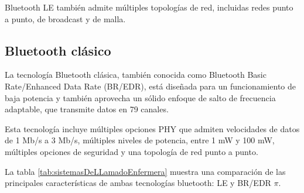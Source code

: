 Bluetooth LE también admite múltiples topologías de red, incluidas redes punto a punto, de broadcast y de malla.


\subsection{Bluetooth clásico}

La tecnología Bluetooth clásica, también conocida como Bluetooth Basic Rate/Enhanced Data Rate (BR/EDR), está diseñada para un funcionamiento de baja potencia y también aprovecha un sólido enfoque de salto de frecuencia adaptable, que transmite datos en 79 canales.

Esta tecnología incluye múltiples opciones PHY que admiten velocidades de datos de 1 Mb/s a 3 Mb/s, múltiples niveles de potencia, entre 1 mW y 100 mW, múltiples opciones de seguridad y una topología de red punto a punto.

La tabla \ref{tab:sistemasDeLLamadoEnfermera} muestra una comparación de las principales características de ambas tecnologías bluetooth: LE y BR/EDR $\pi$.


